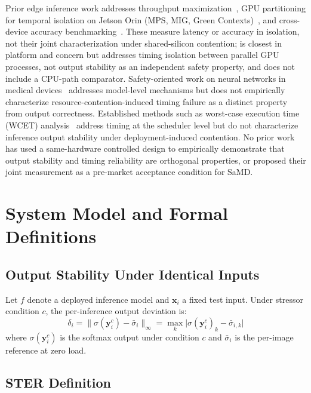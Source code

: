 \documentclass[11pt]{article}
\begin{document}
Prior edge inference work addresses throughput maximization~\cite{hao2023},
GPU partitioning for temporal isolation on Jetson Orin (MPS, MIG, Green
Contexts)~\cite{marin2026}, and cross-device accuracy
benchmarking~\cite{baller2021,tobiasz2023}. These measure latency or accuracy in
isolation, not their joint characterization under shared-silicon contention;
\cite{marin2026} is closest in platform and concern but addresses timing
isolation between parallel GPU processes, not output stability as an independent
safety property, and does not include a CPU-path comparator.
Safety-oriented work on neural networks in medical devices~\cite{becker2019} addresses
model-level mechanisms but does not empirically characterize resource-contention-induced
timing failure as a distinct property from output correctness.
Established methods such as worst-case execution time (WCET) analysis~\cite{wilhelm2008}
address timing at the scheduler level but do not characterize inference output stability
under deployment-induced contention.
No prior work has used a same-hardware controlled design to empirically demonstrate
that output stability and timing reliability are orthogonal properties, or proposed
their joint measurement as a pre-market acceptance condition for SaMD.

\section{System Model and Formal Definitions}

\subsection{Output Stability Under Identical Inputs}

Let $f$ denote a deployed inference model and $\mathbf{x}_i$ a fixed test input.
Under stressor condition $c$, the per-inference output deviation is:
\begin{equation}
  \delta_i = \bigl\|\sigma(\mathbf{y}_i^c) - \bar{\sigma}_i\bigr\|_{\infty}
           = \max_k \bigl|\sigma(\mathbf{y}_i^c)_k - \bar{\sigma}_{i,k}\bigr|
  \label{eq:delta}
\end{equation}
where $\sigma(\mathbf{y}_i^c)$ is the softmax output under condition $c$ and
$\bar{\sigma}_i$ is the per-image reference at zero load.

\subsection{STER Definition}
\end{document}
